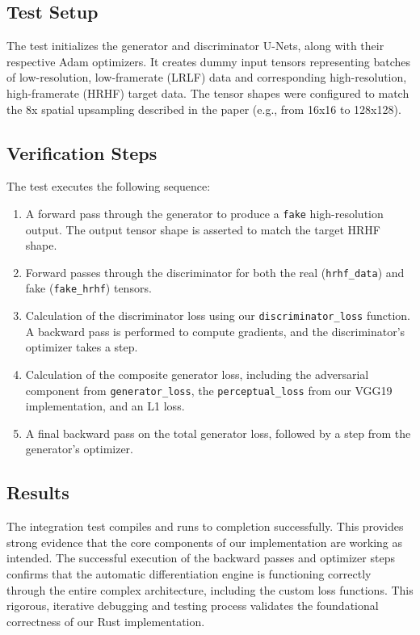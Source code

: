 \documentclass{article}
\begin{document}
\subsection{Test Setup}
The test initializes the generator and discriminator U-Nets, along with their respective Adam optimizers. It creates dummy input tensors representing batches of low-resolution, low-framerate (LRLF) data and corresponding high-resolution, high-framerate (HRHF) target data. The tensor shapes were configured to match the 8x spatial upsampling described in the paper (e.g., from 16x16 to 128x128).

\subsection{Verification Steps}
The test executes the following sequence:
\begin{enumerate}
    \item A forward pass through the generator to produce a \texttt{fake} high-resolution output. The output tensor shape is asserted to match the target HRHF shape.
    \item Forward passes through the discriminator for both the real (\texttt{hrhf\_data}) and fake (\texttt{fake\_hrhf}) tensors.
    \item Calculation of the discriminator loss using our \texttt{discriminator\_loss} function. A backward pass is performed to compute gradients, and the discriminator's optimizer takes a step.
    \item Calculation of the composite generator loss, including the adversarial component from \texttt{generator\_loss}, the \texttt{perceptual\_loss} from our VGG19 implementation, and an L1 loss.
    \item A final backward pass on the total generator loss, followed by a step from the generator's optimizer.
\end{enumerate}

\subsection{Results}
The integration test compiles and runs to completion successfully. This provides strong evidence that the core components of our implementation are working as intended. The successful execution of the backward passes and optimizer steps confirms that the automatic differentiation engine is functioning correctly through the entire complex architecture, including the custom loss functions. This rigorous, iterative debugging and testing process validates the foundational correctness of our Rust implementation.
\end{document}

